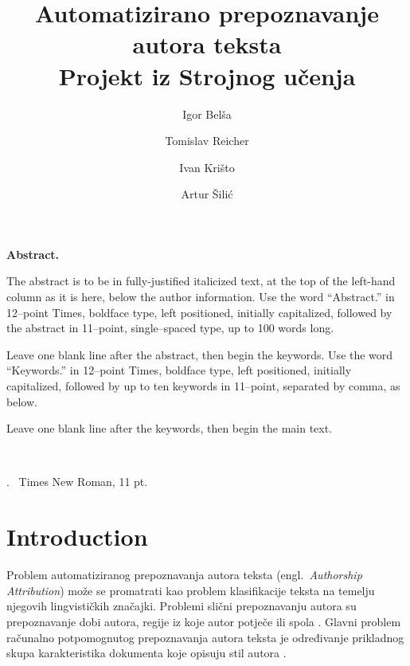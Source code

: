 \documentclass[11pt,english]{article}
\newcommand{\engl}[1]{(engl.~\emph{#1})}
\let\LaTeXtitle\title
\renewcommand{\title}[1]{\LaTeXtitle{\Large \textbf{#1}}}
\renewenvironment{abstract}
{\noindent \large \bf Abstract. \normalsize \begin{it}}
{\end{it}\\}
\newenvironment{keywords}
{\noindent {\large {\bf Keywords}}.~}{}
\begin{document}
\title{Automatizirano prepoznavanje autora teksta\\Projekt iz Strojnog učenja}
\author{Igor Belša}
\author{Tomislav Reicher}
\author{Ivan Krišto}
\author{Artur Šilić}

\date{}

\maketitle

\thispagestyle{empty}
\pagestyle{empty}
\begin{multicols}{2}


\begin{abstract}
The abstract is to be in fully-justified italicized text, at the top of the
left-hand column as it is here, below the author information. Use the word
``Abstract.'' in 12--point Times, boldface type, left positioned, initially
capitalized, followed by the abstract in 11--point, single--spaced type, up to
100 words long.

Leave one blank line after the abstract, then begin the keywords. Use
the word ``Keywords.'' in 12--point Times, boldface type, left positioned,
initially capitalized, followed by up to ten keywords in 11--point, separated
by comma, as below.

Leave one blank line after the keywords, then begin the main text.
\end{abstract}

\begin{keywords}
Times New Roman, 11 pt.
\end{keywords}

\section{Introduction}
Problem automatiziranog prepoznavanja autora teksta \engl{Authorship Attribution}
može se promatrati kao problem klasifikacije teksta na temelju njegovih
lingvističkih značajki. Problemi slični prepoznavanju autora su prepoznavanje
dobi autora, regije iz koje autor potječe ili spola \citep{luyckx2005shallow}.
Glavni problem računalno potpomognutog prepoznavanja autora teksta je određivanje
prikladnog skupa karakteristika dokumenta koje opisuju stil autora
\citep{coyotl2006authorship}.


\end{multicols}
\end{document}
